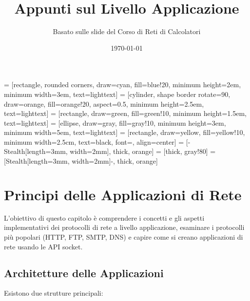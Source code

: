 



\title{\textbf{Appunti sul Livello Applicazione}}
\author{Basato sulle slide del Corso di Reti di Calcolatori}
\date{\today}

 = [rectangle, rounded corners, draw=cyan, fill=blue!20, minimum height=2em, minimum width=3em, text=lighttext]
 = [cylinder, shape border rotate=90, draw=orange, fill=orange!20, aspect=0.5, minimum height=2.5em, text=lighttext]
 = [rectangle, draw=green, fill=green!10, minimum height=1.5em, text=lighttext]
 = [ellipse, draw=gray, fill=gray!10, minimum height=3em, minimum width=5em, text=lighttext]
 = [rectangle, draw=yellow, fill=yellow!10, minimum width=2.5cm, text=black, font=\small, align=center] %
{} = [-{Stealth[length=3mm, width=2mm]}, thick, orange]
 = [thick, gray!80]
 = [{Stealth[length=3mm, width=2mm]}-, thick, orange] %



\maketitle
\tableofcontents
\newpage

\section{Principi delle Applicazioni di Rete}
L'obiettivo di questo capitolo è comprendere i concetti e gli aspetti implementativi dei protocolli di rete a livello applicazione, esaminare i protocolli più popolari (HTTP, FTP, SMTP, DNS) e capire come si creano applicazioni di rete usando le API socket.

\subsection{Architetture delle Applicazioni}
Esistono due strutture principali:

